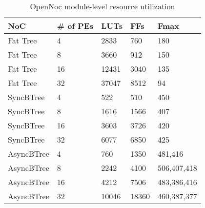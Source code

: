 \begin{table}[!b]
  \centering
  \caption{OpenNoc module-level resource utilization} 
  \begin{tabular}{l|l|l|l|l}
      \toprule
      NoC & \# of PEs & LUTs & FFs & Fmax \\
      \midrule
      \midrule
	  Fat Tree & 4      & 2833 & 760 & 180   \\
      Fat Tree & 8      & 3660 & 912 & 150   \\
      Fat Tree & 16     & 12431 & 3040 & 135 \\
      Fat Tree & 32     & 37047 & 8512 & 94  \\    
      \midrule
      SyncBTree  &  4         &  522 & 510 & 450\\
      SyncBTree  &  8         &  1616 & 1566 & 407\\
      SyncBTree  &  16        &  3603 & 3726 & 420\\
      SyncBTree  &  32        &  6077 & 6850 & 425\\
	  \midrule
      AsyncBTree & 4         & 760  & 1350 & 481,416\\
      AsyncBTree & 8         & 2242 & 4100 & 506,407,418\\
      AsyncBTree & 16        & 4212 & 7506 & 483,386,416 \\
      AsyncBTree & 32        & 10046 & 18360 & 460,387,377\\
      \bottomrule
    \end{tabular}
	\label{table:systemResourceConsumption}
\end{table}